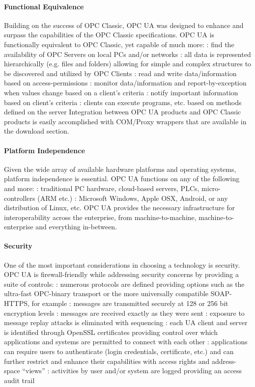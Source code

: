 \documentclass{myproc}
\begin{document}
\paragraph{Functional Equivalence}
Building on the success of OPC Classic, OPC UA was designed to enhance and
surpass the capabilities of the OPC Classic specifications. OPC UA is
functionally equivalent to OPC Classic, yet capable of much more:
\bit
\w {}: find the availability of OPC Servers on local PCs and/or networks
\w {}: all data is represented hierarchically (e.g. files and
folders) allowing for simple and complex structures to be discovered and
utilized by OPC Clients 
\w {}: read and write data/information based on access-permissions
\w {}: monitor data/information and report-by-exception when values change based on a client's criteria
\w {}: notify important information based on client's criteria
\w {}: clients can execute programs, etc. based on methods defined
on the server
\eit
Integration between OPC UA products and OPC Classic products is easily
accomplished with COM/Proxy wrappers that are available in the download
section. 

\paragraph{Platform Independence}
Given the wide array of available hardware platforms and operating systems,
platform independence is essential. OPC UA functions on any of the following
and more: 
\bit
\w {}: traditional PC hardware, cloud-based servers,
PLCs, micro-controllers (ARM etc.) 
\w {}: Microsoft Windows, Apple OSX, Android, or any
distribution of Linux, etc. 
\eit
OPC UA provides the necessary infrastructure for interoperability across the
enterprise, from machine-to-machine, machine-to-enterprise and everything
in-between. 
\paragraph{Security}
One of the most important considerations in choosing a technology is security. OPC UA is firewall-friendly while addressing security concerns by providing a suite of controls:
\bit
\w {}: numerous protocols are defined providing options such as
the ultra-fast OPC-binary transport or the more universally compatible
SOAP-HTTPS, for example 
\w {}: messages are transmitted securely at 128 or 256
bit encryption levels
\w {}: messages are received exactly as they were sent
\w {}: exposure to message replay attacks is eliminated with sequencing
\w {}: each UA client and server is identified through OpenSSL certificates providing control over which applications and systems are permitted to connect with each other
\w {}: applications can require users to authenticate (login credentials, certificate, etc.) and can further restrict and enhance their capabilities with access rights and address-space ``views''
\w {}: activities by user and/or system are logged providing an access audit trail
\eit
\end{document}
